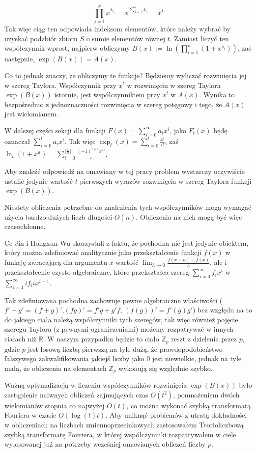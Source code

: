 \documentclass{article}
\begin{document}
$$\prod_{j=1}^{k}x^{s_{i_j}}=x^{\sum_{j=1}^ks_{i_j}}=x^t$$ Tak więc ciąg ten odpowiada indeksom elementów, które należy wybrać
by uzyskać podzbiór zbioru $S$ o sumie elementów równej $t$.
Zamiast liczyć ten współczynnik wprost, najpierw obliczymy $B(x):=\ln(\prod_{i = 1}^{n}(1+x^{s_i}))$, 
zaś następnie, $\exp(B(x)) = A(x)$. 

Co to jednak znaczy, że obliczymy te funkcje? Będziemy wyliczać rozwinięcia jej w szereg Taylora.
Współczynnik przy $x^t$ w rozwinięciu w szereg Taylora $\exp(B(x))$ istotnie, jest współczynnikiem
przy $x^t$ w $A(x)$. Wynika to bezpośrednio z jednoznaczności rozwinięcia w szereg potęgowy i tego, że $A(x)$ jest wielomianem. 

W dalszej części sekcji dla funkcji $F(x)=\sum_{i=0}^{\infty}a_ix^i$, jako
$F_t(x)$ będę oznaczał $\sum_{i=0}^{t}a_ix^i$. Tak więc $\exp_t(x) = \sum_{i=0}^t\frac{x^i}{i!}$, zaś 
$\ln_t(1+x^a)=\sum_{i=0}^{\lfloor \frac{t}{a} \rfloor}\frac{(-1)^{i+1}x^{ai}}{i}$.

Aby znaleźć odpowiedź na omawiany w tej pracy problem wystarczy oczywiście ustalić jedynie 
wartość $t$ pierwszych wyrazów rozwinięcia w szereg Taylora funkcji $\exp(B(x))$.

Niestety obliczenia potrzebne do znalezienia tych współczynników mogą wymagać użycia bardzo dużych liczb długości $O(n)$. 
Obliczenia na nich mogą być więc czasochłonne. 

Ce Jin i Hongxun Wu skorzystali z faktu, że
pochodna nie jest jedynie obiektem, który można zdefiniować analitycznie jako przekształcenie funkcji 
$f(x)$ w funkcję zwracającą dla argumentu $x$ wartość $\lim_{h \to 0}\frac{f(x+h)-f(x)}{h}$, ale 
i przekształcenie czysto algebraiczne, które przekształca szereg $\sum_{i=0}^{\infty}f_i x^i$ w
$\sum_{i=1}^{\infty}if_{i}ix^{i-1}$. 

Tak zdefiniowana pochodna zachowuje pewne algebraiczne właściwości ($f'+g'=(f+g)'$,$(fg)'=f'g+g'f$,
$(f(g))'=f'(g)g'$) bez względu na to do jakiego ciała należą współczynniki tych szeregów, tak więc również pojęcie szeregu
Taylora (z pewnymi ograniczeniami) możemy rozpatrywać w innych ciałach niż $\mathbb{R}$. W naszym przypadku będzie to ciało 
$\mathbb{Z}_p$ reszt z dzielenia przez $p$, gdzie $p$ jest losową liczbą pierwszą na tyle dużą, że prawdopodobieństwo fałszywego 
zakwalifikowania
jakiejś liczby jako $0$ jest niewielkie, jednak na tyle małą, że obliczenia na elementach $\mathbb{Z}_p$ wykonują się względnie szybko.

Ważną optymalizacją w liczeniu współczynników rozwinięcia $\exp(B(x))$ było zastąpienie naiwnych obliczeń
zajmujących czas $O(t^2)$, pomnożeniem dwóch wielomianów stopnia co 
najwyżej $O(t)$, co można wykonać szybką 
transformatą Fouriera w czasie $O(\log(t)t)$. Aby uniknąć problemów z utratą dokładności w obliczeniach na liczbach 
zmiennoprzecinkowych zastosowałem Teorioliczbową szybką transformatę Fouriera, w której współczynniki rozpatrywałem w ciele 
wylosowanej już na potrzeby wcześniej omawianych obliczeń 
liczby $p$.
\end{document}

